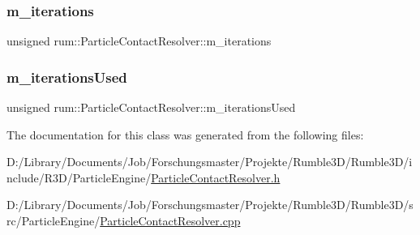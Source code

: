 \subsubsection{\texorpdfstring{m\+\_\+iterations}{m\_iterations}}
{\footnotesize\ttfamily unsigned rum\+::\+Particle\+Contact\+Resolver\+::m\+\_\+iterations\hspace{0.3cm}{\ttfamily [protected]}}

\mbox{\label{classrum_1_1_particle_contact_resolver_ab86206e4f42fb6da8b7e6337d393cfdf}} 
\subsubsection{\texorpdfstring{m\+\_\+iterations\+Used}{m\_iterationsUsed}}
{\footnotesize\ttfamily unsigned rum\+::\+Particle\+Contact\+Resolver\+::m\+\_\+iterations\+Used\hspace{0.3cm}{\ttfamily [protected]}}



The documentation for this class was generated from the following files\+:\begin{DoxyCompactItemize}
\item 
D\+:/\+Library/\+Documents/\+Job/\+Forschungsmaster/\+Projekte/\+Rumble3\+D/\+Rumble3\+D/include/\+R3\+D/\+Particle\+Engine/\mbox{\hyperlink{_particle_contact_resolver_8h}{Particle\+Contact\+Resolver.\+h}}\item 
D\+:/\+Library/\+Documents/\+Job/\+Forschungsmaster/\+Projekte/\+Rumble3\+D/\+Rumble3\+D/src/\+Particle\+Engine/\mbox{\hyperlink{_particle_contact_resolver_8cpp}{Particle\+Contact\+Resolver.\+cpp}}\end{DoxyCompactItemize}

